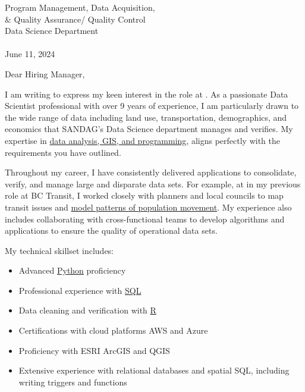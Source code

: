 \documentclass[letterpaper]{article}
\newcommand{\impt}[1]{\uline{#1}}
\begin{document}
\large
Program Management, Data Acquisition, \\
\qquad \& Quality Assurance/ Quality Control \\
Data Science Department \\
\textbf{\JobCompany} \\

\null\hfill June 11, 2024

Dear Hiring Manager,

I am writing to express my keen interest in the
\impt{\JobTitle} role at {\JobCompany}.
As a passionate Data Scientist professional with over 9 years of
experience, I am particularly drawn to the wide range of data
including land use, transportation, demographics, and economics 
that SANDAG's Data Science department manages and verifies.
My expertise in \impt{data analysis, GIS, and programming}, 
aligns perfectly with the requirements you have outlined.

Throughout my career, I have consistently delivered applications to
consolidate, verify, and manage large and disparate data sets.
For example, at in my previous role at BC Transit, I worked closely with
planners and local councils to map transit issues and
\impt{model patterns of population movement}.
My experience also includes collaborating with cross-functional teams to
develop algorithms and applications to ensure the quality of operational data sets.

My technical skillset includes:
\vspace{-12pt}
\begin{itemize} \itemsep 0pt
\item Advanced \impt{Python} proficiency
\item Professional experience with \impt{SQL}
\item Data cleaning and verification with \impt{R}
\item Certifications with cloud platforms AWS and Azure
\item Proficiency with ESRI ArcGIS and QGIS
\item Extensive experience with relational databases and spatial SQL, including writing triggers and functions
\end{itemize}
\end{document}
